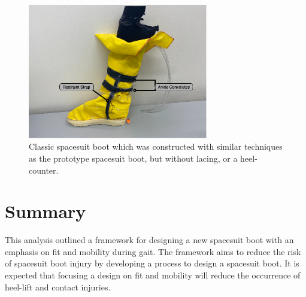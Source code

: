 \documentclass[defaultstyle,11pt]{comps}
\providecommand{\DIFaddbegin}{} %
\providecommand{\DIFaddend}{} %
\providecommand{\DIFdelbegin}{} %
\providecommand{\DIFdelend}{} %
\providecommand{\DIFaddbeginFL}{} %
\providecommand{\DIFaddendFL}{} %
\providecommand{\DIFdelbeginFL}{} %
\providecommand{\DIFdelendFL}{} %
\newcommand{\DIFscaledelfig}{0.5}
\newlength{\DIFdelgraphicswidth} %
\newlength{\DIFdelgraphicsheight} %
\newcommand{\DIFaddincludegraphics}[2][]{{\color{blue}\fbox{\DIFOincludegraphics[#1]{#2}}}} %
\newcommand{\DIFdelincludegraphics}[2][]{%
\sbox{\DIFdelgraphicsbox}{\DIFOincludegraphics[#1]{#2}}%
\settoboxwidth{\DIFdelgraphicswidth}{\DIFdelgraphicsbox} %
\settoboxtotalheight{\DIFdelgraphicsheight}{\DIFdelgraphicsbox} %
\scalebox{\DIFscaledelfig}{%
\parbox[b]{\DIFdelgraphicswidth}{\usebox{\DIFdelgraphicsbox}\\[-\baselineskip] \rule{\DIFdelgraphicswidth}{0em}}\llap{\resizebox{\DIFdelgraphicswidth}{\DIFdelgraphicsheight}{%
\setlength{\unitlength}{\DIFdelgraphicswidth}%
\begin{picture}(1,1)%
\thicklines\linethickness{2pt} %
{\color[rgb]{1,0,0}\put(0,0){\framebox(1,1){}}}%
{\color[rgb]{1,0,0}\put(0,0){\line( 1,1){1}}}%
{\color[rgb]{1,0,0}\put(0,1){\line(1,-1){1}}}%
\end{picture}%
}\hspace*{3pt}}} %
} %
\DeclareRobustCommand{\DIFaddbegin}{\DIFOaddbegin \let\includegraphics\DIFaddincludegraphics} %
\DeclareRobustCommand{\DIFaddend}{\DIFOaddend \let\includegraphics\DIFOincludegraphics} %
\DeclareRobustCommand{\DIFdelbegin}{\DIFOdelbegin \let\includegraphics\DIFdelincludegraphics} %
\DeclareRobustCommand{\DIFdelend}{\DIFOaddend \let\includegraphics\DIFOincludegraphics} %
\DeclareRobustCommand{\DIFaddbeginFL}{\DIFOaddbeginFL \let\includegraphics\DIFaddincludegraphics} %
\DeclareRobustCommand{\DIFaddendFL}{\DIFOaddendFL \let\includegraphics\DIFOincludegraphics} %
\DeclareRobustCommand{\DIFdelbeginFL}{\DIFOdelbeginFL \let\includegraphics\DIFdelincludegraphics} %
\DeclareRobustCommand{\DIFdelendFL}{\DIFOaddendFL \let\includegraphics\DIFOincludegraphics} %
\begin{document}
\DIFdelbegin %
\DIFdelend \begin{figure}
\DIFdelbeginFL %
\DIFdelendFL \DIFaddbeginFL \hypertarget{fig:SA3-classic_boot}{%
\centering
\includegraphics[width=0.7\textwidth,height=\textheight]{../fig/SA3/Classic_Spaceboot.png}
\caption{Classic spacesuit boot which was constructed with similar techniques as the prototype spacesuit boot, but without lacing, or a heel-counter.}\label{fig:SA3-classic_boot}
}
\DIFaddendFL \end{figure}

\DIFdelbegin %
\DIFdelend \DIFaddbegin \hypertarget{summary-5}{%
\section{Summary}\label{summary-5}}
\DIFaddend 

This analysis outlined a framework for designing a new spacesuit boot with an emphasis on fit and mobility during gait.
The framework aims to reduce the risk of spacesuit boot injury by developing a process to design a spacesuit boot.
It is expected that focusing a design on fit and mobility will reduce the occurrence of heel-lift and contact injuries.
\end{document}
